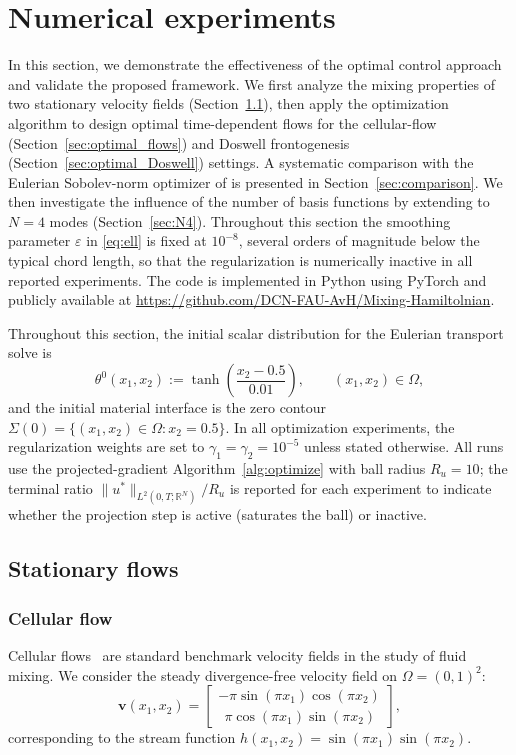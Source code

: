 \documentclass[12pt, reqno]{amsart}
\theoremstyle{plain}
\theoremstyle{definition}
\numberwithin{equation}{section}
\numberwithin{figure}{section}
\numberwithin{algorithm}{section}
\begin{document}
\section{Numerical experiments}\label{sec:numerics_exp}

In this section, we demonstrate the effectiveness of the optimal control approach and validate the proposed framework. We first analyze the mixing properties of two stationary velocity fields (Section~\ref{sec:stationary_flows}), then apply the optimization algorithm to design optimal time-dependent flows for the cellular-flow (Section~\ref{sec:optimal_flows}) and Doswell frontogenesis (Section~\ref{sec:optimal_Doswell}) settings. A systematic comparison with the Eulerian Sobolev-norm optimizer of \cite{hu2026structure} is presented in Section~\ref{sec:comparison}. We then investigate the influence of the number of basis functions by extending to $N=4$ modes (Section~\ref{sec:N4}). Throughout this section the smoothing parameter $\varepsilon$ in \eqref{eq:ell} is fixed at $10^{-8}$, several orders of magnitude below the typical chord length, so that the regularization is numerically inactive in all reported experiments. The code is implemented in Python using PyTorch and publicly available at \url{https://github.com/DCN-FAU-AvH/Mixing-Hamiltolnian}.

Throughout this section, the initial scalar distribution for the Eulerian transport solve is
\begin{equation}\label{eq:theta_init_1}
\theta^0(x_1,x_2) := \tanh\!\left(\frac{x_2-0.5}{0.01}\right),
\qquad (x_1,x_2)\in\Omega,
\end{equation}
and the initial material interface is the zero contour $\Sigma(0)=\{(x_1,x_2)\in\Omega:x_2=0.5\}$. In all optimization experiments, the regularization weights are set to $\gamma_1=\gamma_2=10^{-5}$ unless stated otherwise. All runs use the projected-gradient Algorithm~\ref{alg:optimize} with ball radius $R_u=10$; the terminal ratio $\|u^*\|_{L^2(0,T;\mathbb R^N)}/R_u$ is reported for each experiment to indicate whether the projection step is active (saturates the ball) or inactive.

\subsection{Stationary flows}\label{sec:stationary_flows}

\subsubsection{Cellular flow}
Cellular flows~\cite{Fannjiang2006Quenching} are standard benchmark velocity fields in the study of fluid mixing. We consider the steady divergence-free velocity field on $\Omega=(0,1)^2$:
\begin{equation}\label{eq:cellular}
\mathbf{v}(x_1,x_2)=
\begin{bmatrix}
-\pi\sin(\pi x_1)\cos(\pi x_2)\\[0.3em]
\ \ \pi\cos(\pi x_1)\sin(\pi x_2)
\end{bmatrix},
\end{equation}
corresponding to the stream function $h(x_1,x_2)=\sin(\pi x_1)\sin(\pi x_2)$.
\end{document}
